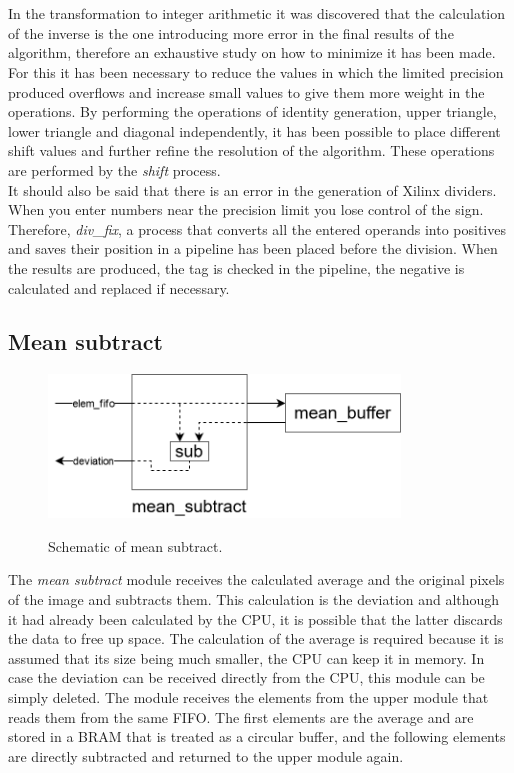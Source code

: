 \\
\\
In the transformation to integer arithmetic it was discovered that the calculation of the inverse is the one introducing more error in the final results of the algorithm, therefore an exhaustive study on how to minimize it has been made. For this it has been necessary to reduce the values in which the limited precision produced overflows and increase small values to give them more weight in the operations. By performing the operations of identity generation, upper triangle, lower triangle and diagonal independently, it has been possible to place different shift values and further refine the resolution of the algorithm. These operations are performed by the \textit{shift} process.
\\
It should also be said that there is an error in the generation of Xilinx dividers. When you enter numbers near the precision limit you lose control of the sign. Therefore, \textit{div\_fix}, a process that converts all the entered operands into positives and saves their position in a pipeline has been placed before the division. When the results are produced, the tag is checked in the pipeline, the negative is calculated and replaced if necessary.

\subsection{Mean subtract}

\begin{figure}[h!]
\centering\textbf{
\includegraphics[height=1.5in]{figures/subtract.png}}
\caption{Schematic of mean subtract.}
  \label{fig:subtract}
\end{figure}
The \textit{mean subtract} module receives the calculated average and the original pixels of the image and subtracts them. This calculation is the deviation and although it had already been calculated by the CPU, it is possible that the latter discards the data to free up space. The calculation of the average is required because it is assumed that its size being much smaller, the CPU can keep it in memory. In case the deviation can be received directly from the CPU, this module can be simply deleted.
The module receives the elements from the upper module that reads them from the same FIFO. The first elements are the average and are stored in a BRAM that is treated as a circular buffer, and the following elements are directly subtracted and returned to the upper module again.


